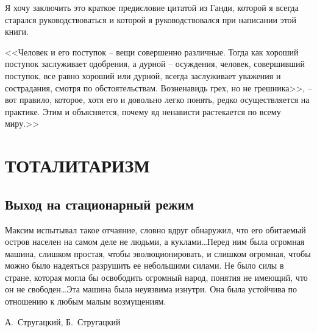 \documentclass{book}
\begin{document}
Я хочу заключить это краткое предисловие цитатой из Ганди, которой я всегда старался руководствоваться и которой я 
руководствовался при написании этой книги.

<<Человек и его поступок -- вещи совершенно различные. Тогда как хороший поступок заслуживает одобрения, а дурной -- осуждения, 
человек, совершивший поступок, все равно хороший или дурной, всегда заслуживает уважения и сострадания, смотря по 
обстоятельствам. Возненавидь грех, но не грешника>>, -- вот правило, которое, хотя его и довольно легко понять, редко 
осуществляется на практике. Этим и объясняется, почему яд ненависти растекается по всему миру.>>%



\newpage
\thispagestyle{empty}



\chapter{ТОТАЛИТАРИЗМ}

\section{Выход на стационарный режим}
\epigraph{Максим испытывал такое отчаяние, словно вдруг обнаружил, что его обитаемый остров населен на самом деле не людьми, а 
куклами\ldots Перед ним была огромная машина, слишком простая, чтобы эволюционировать, и слишком огромная, чтобы можно было 
надеяться разрушить ее небольшими силами. Не было силы в стране, которая могла бы освободить огромный народ, понятия не имеющий, 
что он не свободен\ldots Эта машина была неуязвима изнутри. Она была устойчива по отношению к любым малым возмущениям.}{А.~Стругацкий, Б.~Стругацкий%
}
\end{document}
